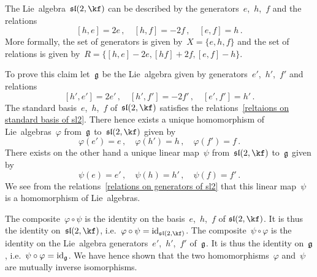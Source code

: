 \begin{example}
  The Lie~algebra~$\sllie(2, \kf)$ can be described by the generators~$e$,~$h$,~$f$ and the relations
  \begin{equation}
    \label{reltaions on standard basis of sl2}
    [h,e] = 2e \,,
    \quad
    [h,f] = -2f \,,
    \quad
    [e,f] = h \,.
  \end{equation}
  More formally, the set of generators is given by~$X = \{ e, h, f \}$ and the set of relations is given by~$ R = \{ [h,e] - 2e, [hf] + 2f, [e,f] - h \} $.

  To prove this claim let~$\mathfrak{g}$ be the Lie~algebra given by generators~$e'$,~$h'$,~$f'$ and relations
  \begin{equation}
    \label{relations on generators of sl2}
    [h', e'] = 2 e' \,,
    \quad
    [h', f'] = -2 f' \,,
    \quad
    [e', f'] = h' \,.
  \end{equation}
  The standard basis~$e$,~$h$,~$f$ of~$\sllie(2, \kf)$ satisfies the relations~\eqref{reltaions on standard basis of sl2}.
  There hence exists a unique homomorphism of Lie~algebras~$\varphi$ from~$\mathfrak{g}$ to~$\sllie(2, \kf)$ given by
  \[
    \varphi(e') = e \,,
    \quad
    \varphi(h') = h \,,
    \quad
    \varphi(f') = f \,.
  \]
  There exists on the other hand a unique linear map~$\psi$ from~$\sllie(2, \kf)$ to~$\mathfrak{g}$ given by
  \[
    \psi(e) = e' \,,
    \quad
    \psi(h) = h' \,,
    \quad
    \psi(f) = f' \,.
  \]
  We see from the relations~\eqref{relations on generators of sl2} that this linear map~$\psi$ is a homomorphism of Lie~algebras.

  The composite~$\varphi \circ \psi$ is the identity on the basis~$e$,~$h$,~$f$ of$~\sllie(2, \kf)$.
  It is thus the identity on~$\sllie(2, \kf)$, i.e.~$\varphi \circ \psi = \id_{\sllie(2, \kf)}$.
  The composite~$\psi \circ \varphi$ is the identity on the Lie~algebra generators~$e'$,~$h'$,~$f'$ of~$\mathfrak{g}$.
  It is thus the identity on~$\mathfrak{g}$, i.e.~$\psi \circ \varphi = \mathrm{id}_{\mathfrak{g}}$.
  We have hence shown that the two homomorphisms~$\varphi$ and~$\psi$ are mutually inverse isomorphisms.
\end{example}


